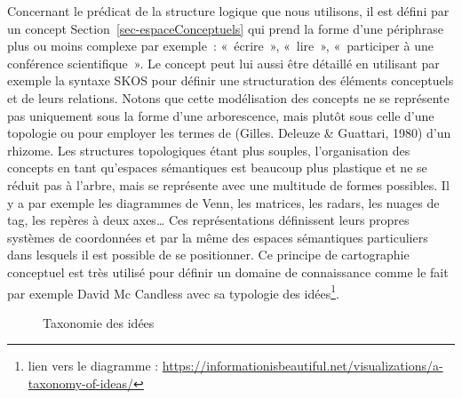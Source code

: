 \documentclass[
  a4paper,
  DIV=11,
  numbers=noendperiod]{scrreprt}
\begin{document}
Concernant le prédicat de la structure logique que nous utilisons, il
est défini par un concept Section~\ref{sec-espaceConceptuels} qui prend
la forme d'une périphrase plus ou moins complexe par exemple~:
«~écrire~», «~lire~», «~participer à une conférence scientifique~». Le
concept peut lui aussi être détaillé en utilisant par exemple la syntaxe
SKOS pour définir une structuration des éléments conceptuels et de leurs
relations. Notons que cette modélisation des concepts ne se représente
pas uniquement sous la forme d'une arborescence, mais plutôt sous celle
d'une topologie ou pour employer les termes de (Gilles. Deleuze \&
Guattari, 1980) d'un rhizome. Les structures topologiques étant plus
souples, l'organisation des concepts en tant qu'espaces sémantiques est
beaucoup plus plastique et ne se réduit pas à l'arbre, mais se
représente avec une multitude de formes possibles. Il y a par exemple
les diagrammes de Venn, les matrices, les radars, les nuages de tag, les
repères à deux axes\ldots{} Ces représentations définissent leurs
propres systèmes de coordonnées et par la même des espaces sémantiques
particuliers dans lesquels il est possible de se positionner. Ce
principe de cartographie conceptuel est très utilisé pour définir un
domaine de connaissance comme le fait par exemple David Mc Candless avec
sa typologie des idées\footnote{lien vers le diagramme :
  \url{https://informationisbeautiful.net/visualizations/a-taxonomy-of-ideas/}}.

\begin{figure}


\caption{\label{fig-TaxonomyIdeas}Taxonomie des idées}

\end{figure}%
\end{document}
